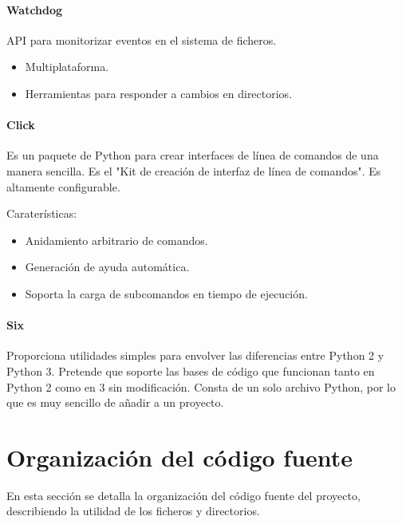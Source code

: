 \paragraph{Watchdog~\cite{watchdog}}

API para monitorizar eventos en el sistema de ficheros.

\begin{itemize}
    \item Multiplataforma.
    \item Herramientas para responder a cambios en directorios.
\end{itemize}

\paragraph{Click~\cite{click}}

Es un paquete de Python para crear interfaces de línea de comandos de una manera
sencilla. Es el "Kit de creación de interfaz de
línea de comandos". Es altamente configurable.

Caraterísticas:

\begin{itemize}
    \item Anidamiento arbitrario de comandos.
    \item Generación de ayuda automática.
    \item Soporta la carga de subcomandos en tiempo de ejecución.
\end{itemize}

\paragraph{Six~\cite{six}}

Proporciona utilidades simples para envolver las diferencias entre Python 2 y Python 3. Pretende
que soporte las bases de código que funcionan tanto en Python 2 como en 3 sin modificación.
Consta de un solo archivo Python, por lo que es muy sencillo de añadir a un proyecto.


\section{Organización del código fuente}

En esta sección se detalla la organización del código fuente del proyecto,
describiendo la utilidad de los ficheros y directorios.


